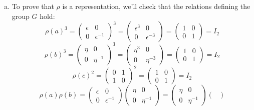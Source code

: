 \begin{solution}
\begin{enumerate}[(a)]
    \item To prove that \(\rho\) is a representation, we'll check that the relations defining the group \(G\) hold:
    \[
        \rho(a)^3 = \begin{pmatrix}
            \epsilon & 0 \\
            0 & \epsilon^{-1}
        \end{pmatrix}^3 = \begin{pmatrix}
            \epsilon^3 & 0 \\
            0 & \epsilon^{-3}
        \end{pmatrix} = \begin{pmatrix}
            1 & 0 \\
            0 & 1
        \end{pmatrix} = I_2
    \]
    \[
        \rho(b)^3 = \begin{pmatrix}
            \eta & 0 \\
            0 & \eta^{-1}
        \end{pmatrix}^3 = \begin{pmatrix}
            \eta^3 & 0 \\
            0 & \eta^{-3}
        \end{pmatrix} = \begin{pmatrix}
            1 & 0 \\
            0 & 1
        \end{pmatrix} = I_2
    \]
    \[
        \rho(c)^2 = \begin{pmatrix}
            0 & 1 \\
            1 & 0
        \end{pmatrix}^2 = \begin{pmatrix}
            1 & 0 \\
            0 & 1
        \end{pmatrix} = I_2
    \]
    \[
        \rho(a)\rho(b) = \begin{pmatrix}
            \epsilon & 0 \\
            0 & \epsilon^{-1}
        \end{pmatrix} \begin{pmatrix}
            \eta & 0 \\
            0 & \eta^{-1}
        \end{pmatrix} = \begin{pmatrix}
            \eta & 0 \\
            0 & \eta^{-1}
        \end{pmatrix} \begin{pmatrix}

\end{pmatrix}\]
\end{enumerate}
\end{solution}
